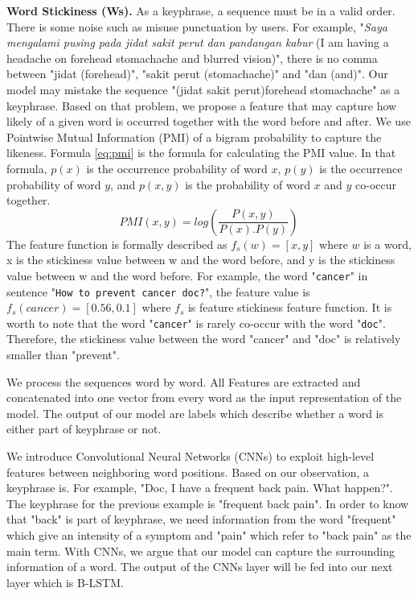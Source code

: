 \documentclass[sigconf]{acmart}
\begin{document}
\textbf{Word Stickiness (Ws).} As a keyphrase, a sequence must be in a valid order. There is some noise such as misuse punctuation by users. For example, "\textit{Saya mengalami pusing pada jidat sakit perut dan pandangan kabur} (I am having a headache on forehead stomachache and blurred vision)", there is no comma between "jidat (forehead)", "sakit perut (stomachache)" and "dan (and)". Our model may mistake the sequence "(jidat sakit perut)forehead stomachache" as a keyphrase. Based on that problem, we propose a feature that may capture how likely of a given word is occurred together with the word before and after. We use Pointwise Mutual Information (PMI) of a bigram probability to capture the likeness. Formula \ref{eq:pmi} is the formula for calculating the PMI value. In that formula, $p(x)$ is the occurrence probability of word $x$, $p(y)$ is the occurrence probability of word $y$, and $p(x, y)$ is the probability of word $x$ and $y$ co-occur together.
\begin{equation}\label{eq:pmi}
PMI(x,y)=log(\frac{P(x, y)}{P(x).P(y)})
\end{equation}
The feature function is formally described as $f_s(w) = [x, y]$ where $w$ is a word, x is the stickiness value between w and the word before, and y is the stickiness value between w and the word before. For example, the word "\texttt{cancer}" in sentence "\texttt{How to prevent cancer doc?}", the feature value is $f_s(cancer) = [0.56, 0.1]$ where $f_s$ is feature stickiness feature function. It is worth to note that the word "\texttt{cancer}" is rarely co-occur with the word "\texttt{doc}". Therefore, the stickiness value between the word "cancer" and "doc" is relatively smaller than "prevent".

We process the sequences word by word. All Features are extracted and concatenated into one vector from every word as the input representation of the model. The output of our model are labels which describe whether a word is either part of keyphrase or not. 

We introduce Convolutional Neural Networks (CNNs) to exploit high-level features between neighboring word positions. Based on our observation, a keyphrase is. For example, "Doc, I have a frequent back pain. What happen?". The keyphrase for the previous example is "frequent back pain". In order to know that "back" is part of keyphrase, we need information from the word "frequent" which give an intensity of a symptom and "pain" which refer to "back pain" as the main term. With CNNs, we argue that our model can capture the surrounding information of a word. The output of the CNNs layer will be fed into our next layer which is B-LSTM.
\end{document}
